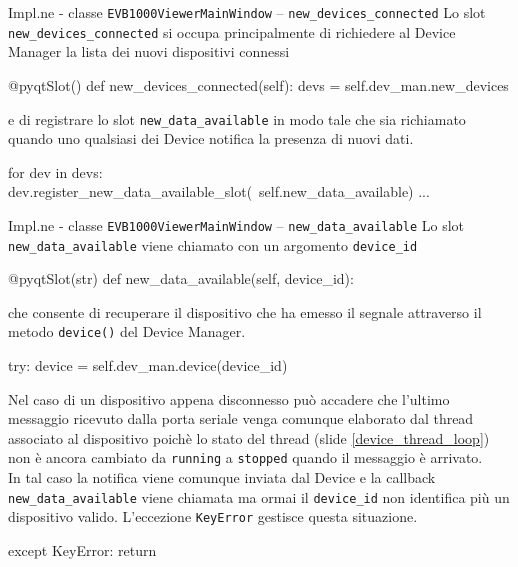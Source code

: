 \begin{frame}[fragile, shrink=10]{Impl.ne - classe \lstinline!EVB1000ViewerMainWindow! -- \lstinline!new_devices_connected!}
  Lo slot \lstinline!new_devices_connected! si occupa principalmente di richiedere al Device
  Manager la lista dei nuovi dispositivi connessi 
  \begin{Python}
    @pyqtSlot()
    def new_devices_connected(self):
        devs = self.dev_man.new_devices
  \end{Python}

  e di registrare lo slot \lstinline!new_data_available! in modo tale che sia richiamato
  quando uno qualsiasi dei Device notifica la presenza di nuovi dati.
  \begin{Python}
        for dev in devs:
            dev.register_new_data_available_slot(\
                self.new_data_available)
        ...    
  \end{Python}
\end{frame}


\begin{frame}[fragile, shrink=30]{Impl.ne - classe \lstinline!EVB1000ViewerMainWindow! -- \lstinline!new_data_available!}
  Lo slot \lstinline!new_data_available! viene chiamato con un argomento \lstinline!device_id!
  \begin{Python}
    @pyqtSlot(str)
    def new_data_available(self, device_id):
  \end{Python}

  che consente di recuperare il dispositivo che ha emesso il segnale attraverso il metodo
  \lstinline!device()! del Device Manager.
  \begin{Python}
        try:
            device = self.dev_man.device(device_id)
  \end{Python}

  Nel caso di un dispositivo appena disconnesso può accadere che l'ultimo
  messaggio ricevuto dalla porta seriale venga comunque elaborato dal thread
  associato al dispositivo poichè lo stato del thread (slide \ref{device_thread_loop}) non è ancora
  cambiato da \lstinline!running! a \lstinline!stopped! quando il messaggio è arrivato.\\
  In tal caso la notifica viene comunque inviata dal Device e la callback \lstinline!new_data_available!
  viene chiamata ma ormai il \lstinline!device_id! non identifica più un dispositivo valido.
  L'eccezione \lstinline!KeyError! gestisce questa situazione.
  \begin{Python}
        except KeyError:
            return

  \end{Python}
\end{frame}

